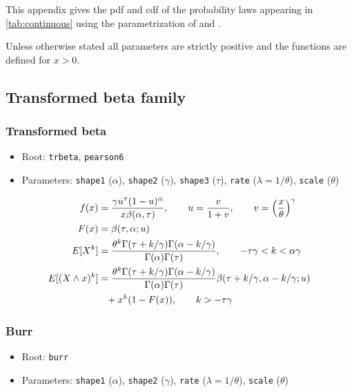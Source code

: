 \documentclass[x11names]{article}
\newcommand{\E}[1]{E[ #1 ]}
\newcommand{\code}[1]{\texttt{#1}}
\begin{document}
This appendix gives the pdf and cdf of the probability laws appearing
in \autoref{tab:continuous} using the parametrization of
\cite{LossModels4e} and \cite{HoggKlugman}.

Unless otherwise stated all parameters are strictly positive and the
functions are defined for $x > 0$.

\subsection{Transformed beta family}
\label{sec:appendix:transformed-beta}

\subsubsection*{Transformed beta}

\begin{itemize}
\item Root: \code{trbeta}, \code{pearson6}
\item Parameters: \code{shape1} ($\alpha$),
      \code{shape2} ($\gamma$),
      \code{shape3} ($\tau$),
      \code{rate}   ($\lambda = 1/\theta$),
      \code{scale}  ($\theta$)
\end{itemize}

\begin{align*}
  f(x)
  &= \frac{\gamma u^\tau (1 - u)^\alpha}{x \beta
    (\alpha, \tau )},
    \qquad u = \frac{v}{1 + v},
    \qquad v = \left(\frac{x}{\theta} \right)^\gamma \\
  F(x)
  &= \beta (\tau, \alpha ; u) \\
  \E{X^k}
  &= \frac{%
    \theta^k \Gamma(\tau+k/\gamma) \Gamma(\alpha-k/\gamma)}{%
    \Gamma(\alpha) \Gamma(\tau)},
    \qquad -\tau\gamma < k < \alpha\gamma \\
  \E{(X \wedge x)^k}
  &= \frac{%
    \theta^k \Gamma(\tau+k/\gamma) \Gamma(\alpha-k/\gamma)}{%
    \Gamma(\alpha) \Gamma(\tau)}
    \beta(\tau+k/\gamma, \alpha-k/\gamma; u) \\
  &\phantom{=} + x^k (1 - F(x)),
    \qquad k > -\tau\gamma
\end{align*}

\subsubsection*{Burr}

\begin{itemize}
\item Root: \code{burr}
\item Parameters: \code{shape1} ($\alpha$),
      \code{shape2} ($\gamma$),
      \code{rate}   ($\lambda = 1/\theta$),
      \code{scale}  ($\theta$)
\end{itemize}
\end{document}
